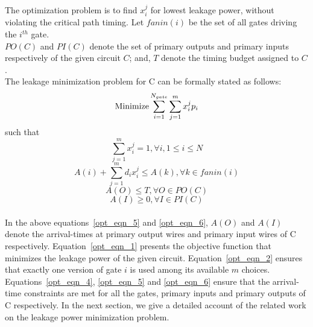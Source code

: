 %
The optimization problem is to find $x_{i}^{j}$ for lowest leakage power, without violating the critical path timing. Let $fanin(i)$ be the set of all gates driving the $i^{th}$ gate.\\
$PO(C)$ and $PI(C)$ denote the set of  primary outputs and  primary inputs respectively of the given circuit $C$; and, $T$ denote the timing budget assigned to $C$.\\
The leakage minimization problem for C can be formally stated as follows:
\begin{equation}\label{opt_eqn_1} {\Large{\underset{}{\operatorname{Minimize}}\sum_{i=1}^{N_{gate}} \sum_{j=1}^{m} x_{i}^{j} p_{i}}}  \end{equation}
\indent \indent \indent \indent \indent such that
\begin{equation}\label{opt_eqn_2} \sum_{j=1}^{m} x_{i}^{j} = 1, \forall i, 1 \leq i \leq N\end{equation}
\begin{equation}\label{opt_eqn_4} A(i) + \sum_{j=1}^{m} d_{i} x_{i}^{j} \le A(k), \forall k \in fanin(i)\end{equation}
\begin{equation}\label{opt_eqn_5} A(O) \le T, \forall O \in PO(C) \end{equation}
\begin{equation}\label{opt_eqn_6} A(I) \ge 0, \forall I \in PI(C)\end{equation}\\



\noindent In the above equations~\ref{opt_eqn_5} and \ref{opt_eqn_6}, $A(O)$ and $A(I)$ denote the arrival-times at primary output wires and primary input wires of C respectively. Equation~\ref{opt_eqn_1} presents the objective function that minimizes the leakage power of the given circuit.
Equation~\ref{opt_eqn_2} ensures that exactly one version of gate $i$ is used among its available $m$ choices.
Equations~\ref{opt_eqn_4}, \ref{opt_eqn_5} and \ref{opt_eqn_6} ensure that the arrival-time constraints are met for all the gates, primary inputs and primary outputs of C respectively. In the next section, we give a detailed account of the related work on the leakage power minimization problem.
